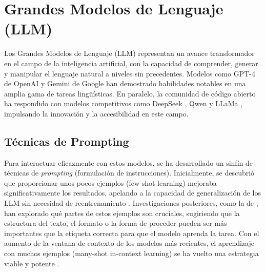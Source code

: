 \section{Grandes Modelos de Lenguaje (LLM)}
\label{sec:llm}
Los Grandes Modelos de Lenguaje (LLM) representan un avance transformador en el campo de la inteligencia artificial, con la capacidad de comprender, generar y manipular el lenguaje natural a niveles sin precedentes. Modelos como GPT-4 de OpenAI \parencite{openaiGPT4TechnicalReport2024} y Gemini de Google \parencite{teamGeminiFamilyHighly2024} han demostrado habilidades notables en una amplia gama de tareas lingüísticas. En paralelo, la comunidad de código abierto ha respondido con modelos competitivos como DeepSeek \parencite{deepseek-aiDeepSeekV3TechnicalReport2024}, Qwen \parencite{baiQwenTechnicalReport2023} y LLaMa \parencite{grattafioriLlama3Herd2024}, impulsando la innovación y la accesibilidad en este campo.

\subsection{Técnicas de Prompting}
\label{subsec:prompting_techniques}
Para interactuar eficazmente con estos modelos, se ha desarrollado un sinfín de técnicas de \textit{prompting} (formulación de instrucciones). Inicialmente, se descubrió que proporcionar unos pocos ejemplos (few-shot learning) mejoraba significativamente los resultados, apelando a la capacidad de generalización de los LLM sin necesidad de reentrenamiento \parencite{brownLanguageModelsAre2020}. Investigaciones posteriores, como la de \cite{minRethinkingRoleDemonstrations2022}, han explorado qué partes de estos ejemplos son cruciales, sugiriendo que la estructura del texto, el formato o la forma de proceder pueden ser más importantes que la etiqueta correcta para que el modelo aprenda la tarea. Con el aumento de la ventana de contexto de los modelos más recientes, el aprendizaje con muchos ejemplos (many-shot in-context learning) se ha vuelto una estrategia viable y potente \parencite{agarwalManyShotInContextLearning2024}.

